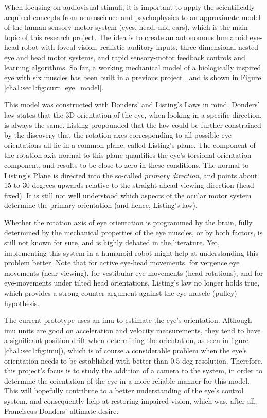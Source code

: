 When focusing on audiovisual stimuli, it is important to apply the scientifically acquired concepts from neuroscience and psychophysics to an approximate model of the human sensory-motor system (eyes, head, and ears), which is the main topic of this research project.
The idea is to create an autonomous humanoid eye-head robot with foveal vision, realistic auditory inputs, three-dimensional nested eye and head motor systems, and rapid sensory-motor feedback controls and learning algorithms. So far, a working mechanical model of a biologically inspired eye with six muscles has been built in a previous project \cite{tesemiguel}, and is shown in Figure \ref{cha1:sec1:fig:curr_eye_model}.  

This model was constructed with Donders' and Listing's Laws in mind. Donders' law states that the 3D orientation of the eye, when looking in a specific direction, is always the same. Listing propounded that the law could be further constrained by the discovery that the rotation axes corresponding to all possible eye orientations  all lie in a common plane, called Listing's plane. The component of the rotation axis normal to this plane quantifies the eye's torsional orientation component, and results to be close to zero in these conditions. The normal to Listing’s Plane is directed into the so-called \textit{primary direction}, and points about 15 to 30 degrees upwards relative to the straight-ahead viewing direction (head fixed). It is still not well understood which aspects of the ocular motor system determine the primary orientation (and hence, Listing's law).

Whether the rotation axis of eye orientation is programmed by the brain, fully determined by the mechanical properties of the eye muscles, or by both factors, is still not known for sure, and is highly debated in the literature. Yet, implementing this system in a humanoid robot might help at understanding this problem better. Note that for active eye-head movements, for vergence eye movements (near viewing), for vestibular eye movements (head rotations), and for eye-movements under tilted head orientations, Listing’s law no longer holds true, which provides a strong counter argument against the eye muscle (pulley) hypothesis. \cite{donders}

The current prototype uses an \acrfull{imu} to estimate the eye's orientation. Although \acrshort{imu} units are good on acceleration and velocity measurements, they tend to have a significant position drift when determining the orientation, as seen in figure \ref{cha1:sec1:fig:imu}), which is of course a considerable problem when the eye's orientation needs to be established with better than 0.5 deg resolution. Therefore, this project's focus is to study the addition of a camera to the system, in order to determine the orientation of the eye in a more reliable manner for this model. This will hopefully contribute to a better understanding of the eye's control system, and consequently help at restoring impaired vision, which was, after all, Franciscus Donders' ultimate desire.

